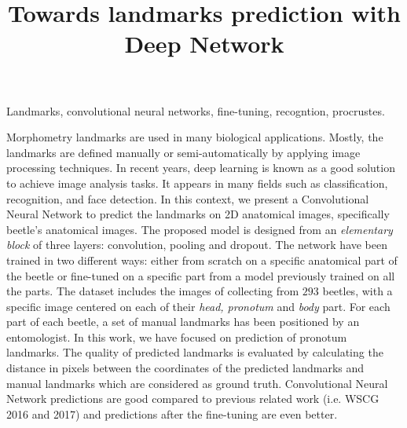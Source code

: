\documentclass[10pt]{article}
\begin{document}
\noindent



\title{Towards landmarks prediction with Deep Network}




\maketitle

\keywords
Landmarks, convolutional neural networks, fine-tuning, recogntion, procrustes.

\abstract
Morphometry landmarks are used in many biological
applications. Mostly, the landmarks are defined manually or
semi-automatically by applying image processing techniques. In recent
years, deep learning is known as a good solution to achieve image analysis tasks. It appears in many fields such as
classification, recognition, and face detection. In this context, we
present a Convolutional Neural Network to predict the landmarks on 2D
anatomical images, specifically beetle's anatomical images. The proposed model is designed from an \textit{elementary block} of three layers: convolution, pooling and dropout. The network have been trained in two different ways: either from scratch on a specific anatomical part of the beetle or fine-tuned on a specific part from a model previously trained on all the parts. The dataset includes the images of 
collecting from $293$ beetles, with a specific image centered on each of their \textit{head, pronotum} and \textit{body} part.
 For each part of each beetle, a set of manual landmarks has been positioned by an entomologist. In this work, we have focused on prediction of pronotum landmarks. The quality of predicted landmarks
is evaluated by calculating the distance in pixels between the
coordinates of the predicted landmarks and manual landmarks which are
considered as ground truth. Convolutional Neural Network predictions are good compared to previous related work (i.e. WSCG 2016 and 2017) and predictions after the fine-tuning are even better.
\end{document}
